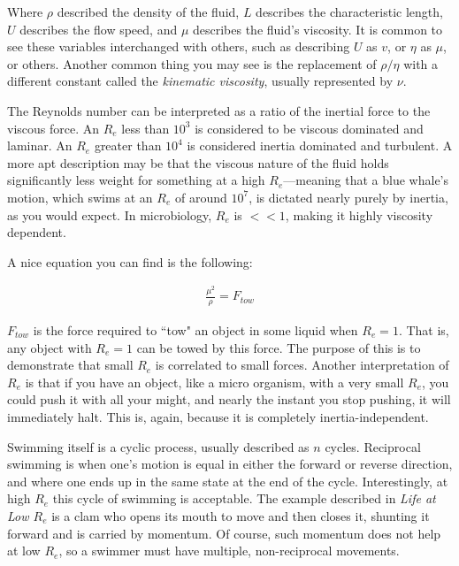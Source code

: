 \nopagebreak

Where $\rho$ described the density of the fluid, $L$ describes the characteristic length, $U$ describes the flow speed, and $\mu$ describes the fluid's viscosity. It is common to see these variables interchanged with others, such as describing $U$ as $v$, or $\eta$ as $\mu$, or others. Another common thing you may see is the replacement of $\rho / \eta$ with a different constant called the \textit{kinematic viscosity}, usually represented by $\nu$. \newline

The Reynolds number can be interpreted as a ratio of the inertial force to the viscous force. An $R_e$ less than $10^3$ is considered to be viscous dominated and laminar. An $R_e$ greater than $10^4$ is considered inertia dominated and turbulent. A more apt description may be that the viscous nature of the fluid holds significantly less weight for something at a high $R_e$---meaning that a blue whale's motion, which swims at an $R_e$ of around $10^7$, is dictated nearly purely by inertia, as you would expect. In microbiology, $R_e$ is $<< 1$, making it highly viscosity dependent.\newline

A nice equation you can find is the following: 

\begin{equation} \label{tow}
\begin{split}
\frac{\mu^2}{\rho} = F_{tow}
\end{split}
\end{equation}

$F_{tow}$ is the force required to ``tow" an object in some liquid when $R_e = 1$. That is, any object with $R_e = 1$ can be towed by this force. The purpose of this is to demonstrate that small $R_e$ is correlated to small forces. Another interpretation of $R_e$ is that if you have an object, like a micro organism, with a very small $R_e$, you could push it with all your might, and nearly the instant you stop pushing, it will immediately halt. This is, again, because it is completely inertia-independent.\newline

Swimming itself is a cyclic process, usually described as $n$ cycles. Reciprocal swimming is when one's motion is equal in either the forward or reverse direction, and where one ends up in the same state at the end of the cycle. Interestingly, at high $R_e$ this cycle of swimming is acceptable. The example described in \textit{Life at Low $R_e$} is a clam who opens its mouth to move and then closes it, shunting it forward and is carried by momentum. Of course, such momentum does not help at low $R_e$, so a swimmer must have multiple, non-reciprocal movements. 

